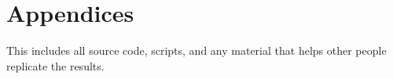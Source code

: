 \section{Appendices}

This includes all source code, scripts, and any material that helps other people replicate the results. 

